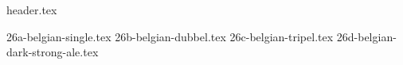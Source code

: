 \clearpage
{}
\divisorLine
{header.tex}
\begin{multicols}{2}
{26a-belgian-single.tex}
{26b-belgian-dubbel.tex}
{26c-belgian-tripel.tex}
{26d-belgian-dark-strong-ale.tex}
\end{multicols}
